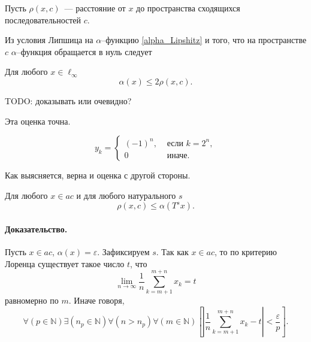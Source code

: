 Пусть $\rho(x,c)$~--- расстояние от $x$ до пространства сходящихся последовательностей $c$.

Из условия Липшица на $\alpha$--функцию \eqref{alpha_Lipshitz}
и того, что на пространстве $c$
$\alpha$--функция обращается в нуль следует

\begin{lemma}
\label{thm:alpha_x_leq_2_rho_x_c}
	Для любого $x\in\ell_\infty$
	\begin{equation}
		\alpha(x) \leq 2\rho(x, c)
		.
	\end{equation}
\end{lemma}

TODO: доказывать или очевидно?

Эта оценка точна.
\begin{example}
\label{ex:alpha_ac_rho_x_c}
	\begin{equation}
	\label{eq:alpha_ac_distance_example_y}
		y_k = \begin{cases}
			(-1)^n, &\mbox{~если~} k = 2^n,
			\\
			0 &\mbox{~иначе.}
		\end{cases}
	\end{equation}
\end{example}

Как выясняется, верна и оценка с другой стороны.

\begin{lemma}
\label{thm:rho_x_c_leq_alpha_t_s_x}
	Для любого $x\in ac$ и для любого натурального $s$
	\begin{equation}
		\rho(x,c)\leq \alpha(T^s x)
		.
	\end{equation}
\end{lemma}
\paragraph{Доказательство.}
Пусть $x\in ac$, $\alpha(x)=\varepsilon$.
Зафиксируем $s$.
Так как $x\in ac$, то по критерию Лоренца существует такое число $t$,
что
\begin{equation}
	\lim_{n\to\infty} \frac{1}{n} \sum_{k=m+1}^{m+n} x_k = t
\end{equation}
равномерно по $m$.
Иначе говоря,
\begin{equation}
	\forall(p\in\mathbb{N})
	\exists(n_p \in\mathbb{N})\forall(n>n_p)\forall(m\in\mathbb{N})
	\left[
		\left|
			\frac{1}{n}\sum_{k=m+1}^{m+n} x_k
			-t
		\right|
		<\frac{\varepsilon}{p}
	\right]
	.
\end{equation}

